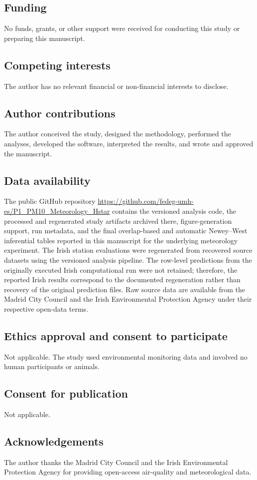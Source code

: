 \documentclass[pdflatex,sn-basic,iicol]{sn-jnl}
\begin{document}
\subsection*{Funding}
No funds, grants, or other support were received for conducting this study or
preparing this manuscript.

\subsection*{Competing interests}
The author has no relevant financial or non-financial interests to disclose.

\subsection*{Author contributions}
The author conceived the study, designed the methodology, performed the analyses, developed the software, interpreted the results, and wrote and approved the manuscript.

\subsection*{Data availability}
The public GitHub repository \url{https://github.com/fedeg-umh-es/P1_PM10_Meteorology_Hstar}
contains the versioned analysis code, the processed and regenerated study
artifacts archived there, figure-generation support, run metadata, and the
final overlap-based and automatic Newey--West inferential tables reported in
this manuscript for the underlying meteorology experiment.
The Irish station evaluations were regenerated from recovered source datasets
using the versioned analysis pipeline. The row-level predictions from the
originally executed Irish computational run were not retained; therefore, the
reported Irish results correspond to the documented regeneration rather than
recovery of the original prediction files. Raw source data are available from
the Madrid City Council and the Irish Environmental Protection Agency under
their respective open-data terms.

\subsection*{Ethics approval and consent to participate}
Not applicable. The study used environmental monitoring data and involved no
human participants or animals.

\subsection*{Consent for publication}
Not applicable.

\subsection*{Acknowledgements}
The author thanks the Madrid City Council and the Irish Environmental Protection
Agency for providing open-access air-quality and meteorological data.



\FloatBarrier

\end{document}

